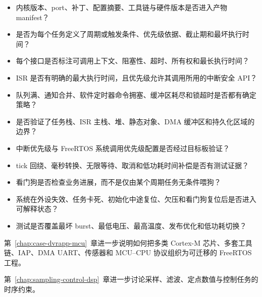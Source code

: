 \begin{itemize}
  \item 内核版本、port、补丁、配置摘要、工具链与硬件版本是否进入产物 manifest？
  \item 是否为每个任务定义了周期或触发条件、优先级依据、截止期和最坏执行时间？
  \item 每个接口是否标注可调用上下文、阻塞性、超时、所有权和最长执行时间？
  \item ISR 是否有明确的最大执行时间，且优先级允许其调用所用的中断安全 API？
  \item 队列满、通知合并、软件定时器命令拥塞、缓冲区耗尽和锁超时是否都有确定策略？
  \item 是否验证了任务栈、ISR 主栈、堆、静态对象、DMA 缓冲区和持久化区域的边界？
  \item 中断优先级与 FreeRTOS 系统调用优先级配置是否经过目标板验证？
  \item tick 回绕、毫秒转换、无限等待、取消和低功耗时间补偿是否有测试证据？
  \item 看门狗是否检查业务进展，而不是仅由某个周期任务无条件喂狗？
  \item 系统在外设失效、任务卡死、初始化中途复位、欠压和看门狗复位后是否进入可解释状态？
  \item 测试是否覆盖最坏 burst、最低电压、最高温度、发布优化和低功耗切换？
\end{itemize}

第~\ref{chap:case-dvrapp-mcu}~章进一步说明如何把多类 Cortex-M 芯片、多套工具链、IAP、DMA UART、传感器和 MCU--CPU 协议组织为可迁移的 FreeRTOS 工程。

第~\ref{chap:sampling-control-dsp}~章进一步讨论采样、滤波、定点数值与控制任务的时序约束。
